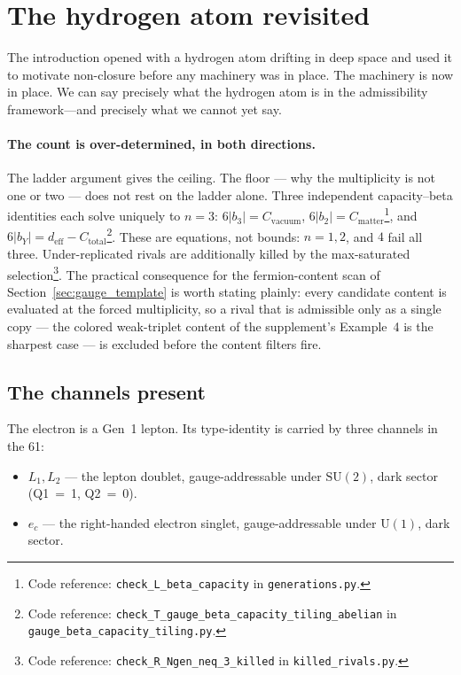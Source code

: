 \documentclass[11pt]{article}
\newenvironment{varlist}{\begin{itemize}[nosep,leftmargin=2em]}{\end{itemize}}
\newcommand{\coderef}[2]{\footnote{Code reference: \texttt{#1} in \texttt{#2}.}}
\newcommand{\SU}{\mathrm{SU}}
\newcommand{\U}{\mathrm{U}}
\begin{document}
\section{The hydrogen atom revisited}
\label{sec:hydrogen_revisited}

The introduction opened with a hydrogen atom drifting in deep space and
used it to motivate non-closure before any machinery was in place.  The
machinery is now in place.  We can say precisely what the hydrogen atom
is in the admissibility framework---and precisely what we cannot yet say.


\paragraph{The count is over-determined, in both directions.}  The ladder
argument gives the ceiling.  The floor --- why the multiplicity is not one or
two --- does not rest on the ladder alone.  Three independent capacity--beta
identities each solve uniquely to $n = 3$: $6|b_3| = C_{\mathrm{vacuum}}$,
$6|b_2| = C_{\mathrm{matter}}$\coderef{check\_L\_beta\_capacity}{generations.py},
and $6|b_Y| = d_{\mathrm{eff}} - C_{\mathrm{total}}$\coderef{check\_T\_gauge\_beta\_capacity\_tiling\_abelian}{gauge\_beta\_capacity\_tiling.py}.
These are equations, not bounds: $n = 1, 2$, and $4$ fail all three.
Under-replicated rivals are additionally killed by the max-saturated
selection\coderef{check\_R\_Ngen\_neq\_3\_killed}{killed\_rivals.py}.  The
practical consequence for the fermion-content scan of
Section~\ref{sec:gauge_template} is worth stating plainly: every candidate
content is evaluated at the forced multiplicity, so a rival that is admissible
only as a single copy --- the colored weak-triplet content of the supplement's
Example~4 is the sharpest case --- is excluded before the content filters
fire.

\subsection*{The channels present}

The electron is a Gen~1 lepton.  Its type-identity is carried by three
channels in the 61:

\begin{varlist}
\item $L_1, L_2$ --- the lepton doublet, gauge-addressable under
$\SU(2)$, dark sector (Q1~=~1, Q2~=~0).
\item $e_c$ --- the right-handed electron singlet, gauge-addressable
under $\U(1)$, dark sector.
\end{varlist}
\end{document}
